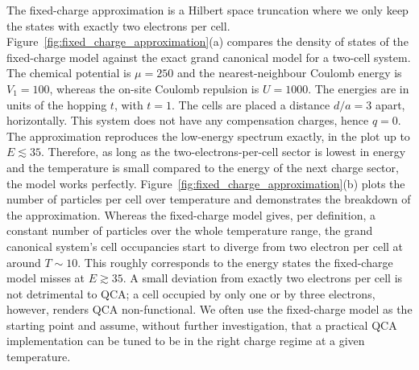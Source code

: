 The fixed-charge approximation is a Hilbert space truncation where we only keep
the states with exactly two electrons per cell.
Figure~\ref{fig:fixed_charge_approximation}(a) compares the density of states of
the fixed-charge model against the exact grand canonical model for a two-cell
system. The chemical potential is $\mu = 250$ and the nearest-neighbour Coulomb
energy is $V_1 = 100$, whereas the on-site Coulomb repulsion is $U = 1000$. The
energies are in units of the hopping $t$, with $t = 1$. The cells are placed a
distance $d/a = 3$ apart, horizontally. This system does not have any
compensation charges, hence $q = 0$. The approximation reproduces the low-energy
spectrum exactly, in the plot up to $E \lesssim 35$. Therefore, as long as the
two-electrons-per-cell sector is lowest in energy and the temperature is small
compared to the energy of the next charge sector, the model works perfectly.
Figure~\ref{fig:fixed_charge_approximation}(b) plots the number of particles per
cell over temperature and demonstrates the breakdown of the approximation.
Whereas the fixed-charge model gives, per definition, a constant number of
particles over the whole temperature range, the grand canonical system's cell
occupancies start to diverge from two electron per cell at around $T \sim 10$.
This roughly corresponds to the energy states the fixed-charge model misses at
$E \gtrsim 35$. A small deviation from exactly two electrons per cell is not
detrimental to QCA; a cell occupied by only one or by three electrons, however,
renders QCA non-functional. We often use the fixed-charge model as the starting
point and assume, without further investigation, that a practical QCA
implementation can be tuned to be in the right charge regime at a given
temperature.

